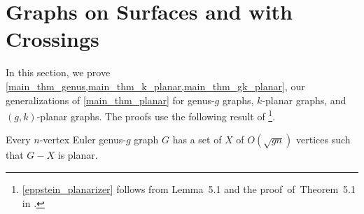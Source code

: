 \documentclass{patmorin}
\newcommand{\david}[1]{{\color{orange} David: #1}}
\newcommand{\pat}[1]{\textcolor{Blue}{Pat: #1}}
\begin{document}
\section{Graphs on Surfaces and with Crossings}
\label{genus_section}
\label{k_planar_section}

In this section, we prove \cref{main_thm_genus,main_thm_k_planar,main_thm_gk_planar}, our generalizations of \cref{main_thm_planar} for genus-$g$ graphs, $k$-planar graphs, and $(g,k)$-planar graphs. The proofs use the following result  of \citet{eppstein:dynamic}\footnote{\cref{eppstein_planarizer} follows from Lemma~5.1 and the proof~of~Theorem~5.1 in \cite{eppstein:dynamic}.}.

\begin{thm}
\label{eppstein_planarizer}
  Every $n$-vertex Euler genus-$g$ graph $G$ has a set of $X$ of $O(\sqrt{gn})$ vertices such that $G-X$ is planar.
\end{thm}





\end{document}
